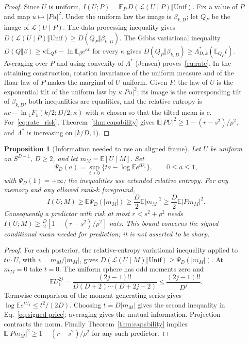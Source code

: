 \documentclass[12pt]{article}
\newtheorem{proposition}[theorem]{Proposition}
\theoremstyle{definition}
\newcommand{\E}{\mathbb E}
\begin{document}
\begin{proof}
Since $U$ is uniform, $I(U;P)=\E_P\,D(\mathcal L(U\mid P)\Vert\mathrm{Unif})$. Fix a value of $P$ and map $u\mapsto|Pu|^2$. Under the uniform law the image is $\beta_{k,D}$; let $Q_P$ be the image of $\mathcal L(U\mid P)$. The data-processing inequality gives $D(\mathcal L(U\mid P)\Vert\mathrm{Unif})\ge D(Q_P\Vert\beta_{k,D})$. The Gibbs variational inequality $D(Q\Vert\beta)\ge\kappa\E_Qt-\ln\E_\beta e^{\kappa t}$ for every $\kappa$ gives $D(Q_P\Vert\beta_{k,D})\ge\Lambda^*_{D,k}(\E_{Q_P}t)$. Averaging over $P$ and using convexity of $\Lambda^*$ (Jensen) proves~\eqref{eq:rate}. In the attaining construction, rotation invariance of the uniform measure and of the Haar law of $P$ makes the marginal of $U$ uniform. Given $P$, the law of $U$ is the exponential tilt of the uniform law by $\kappa|Pu|^2$; its image is the corresponding tilt of $\beta_{k,D}$, both inequalities are equalities, and the relative entropy is $\kappa c-\ln{}_1F_1(k/2;D/2;\kappa)$ with $\kappa$ chosen so that the tilted mean is $c$. For~\eqref{eq:rate_risk}, Theorem~\ref{thm:capability} gives $\E|PU|^2\ge1-(r-s^2)/\rho^2$, and $\Lambda^*$ is increasing on $[k/D,1)$.
\end{proof}

\begin{proposition}[Information needed to use an aligned frame]
\label{prop:signed-model}
Let $U$ be uniform on $S^{D-1}$, $D\ge2$, and let $m_M=\E[U\mid M]$.
Set
\[
 \Psi_D(a)=\sup_{t\ge0}\{ta-\log\E e^{tU_1}\},\qquad 0\le a\le1,
\]
with $\Psi_D(1)=+\infty$; the inequalities use extended relative entropy.
For any memory and any allowed rank-$k$ foreground,
\begin{equation}\label{eq:signed-price}
 I(U;M)\ge\E\Psi_D(|m_M|)
 \ge\frac D2\E|m_M|^2
 \ge\frac D2\E|Pm_M|^2.
\end{equation}
Consequently a predictor with risk at most $r<s^2+\rho^2$ needs
$I(U;M)\ge \frac D2[1-(r-s^2)/\rho^2]$ nats.
This bound concerns the signed conditional mean needed for prediction;
it is not asserted to be sharp.
\end{proposition}
\begin{proof}
For each posterior, the relative-entropy variational inequality applied
to $t v\cdot U$, with $v=m_M/|m_M|$, gives
$D(\mathcal L(U\mid M)\Vert\mathrm{Unif})\ge\Psi_D(|m_M|)$.
At $m_M=0$ take $t=0$. The uniform sphere has odd moments zero and
\[
 \E U_1^{2j}
 =\frac{(2j-1)!!}{D(D+2)\cdots(D+2j-2)}
 \le\frac{(2j-1)!!}{D^j}.
\]
Termwise comparison of the moment-generating series gives
$\log\E e^{tU_1}\le t^2/(2D)$. Choosing $t=D|m_M|$ gives the second
inequality in Eq.~\eqref{eq:signed-price}; averaging gives the mutual
information. Projection contracts the norm. Finally
Theorem~\ref{thm:capability} implies
$\E|Pm_M|^2\ge1-(r-s^2)/\rho^2$ for any such predictor.
\end{proof}
\end{document}
